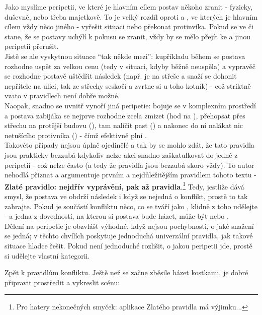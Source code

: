 \documentclass[../main.tex]{subfiles}
\begin{document}
Jako  myslíme peripetii, ve které je hlavním cílem postav někoho zranit - fyzicky, duševně, nebo třeba majetkově. To je velký rozdíl oproti  a , ve kterých je hlavním cílem vždy něco jiného - vyřešit situaci nebo překonat protinvíka. Pokud se ve  či  stane, že se postavy uchýlí k pokusu se zranit, vždy by se mělo přejít ke  a jinou peripetii přerušit.\\
Jistě se ale vyskytnou situace ``tak někde mezi'': kupříkladu během  se postava rozhodne uspět za velkou cenu (tedy v situaci, kdyby běžně neuspěla) a vypravěč se rozhodne postavě uštědřit následek (např. je na střeše a snaží se dohonit nepřítele na ulici, tak ze střechy seskočí a zvrtne si u toho kotník) - což striktně vzato v pravidlech  není dobře možné.\\
Naopak, snadno se uvnitř  vynoří jiná peripetie: bojuje se v komplexním prostředí a postava zabijáka se nejprve rozhodne zcela zmizet (hod na ), přehopsat přes střechu na protější budovu (), tam nalíčit past () a nakonec do ní nalákat nic netušícího protivníka () - čímž efektivně plní .\\
Takovéto případy nejsou úplně ojedinělé a tak by se mohlo zdát, že tato pravidla jsou prakticky bezzubá kdykoliv nelze akci snadno zaškatulkovat do jedné z peripetií - což nelze často (a tedy že pravidla jsou bezzubá skoro vždy). To autor nehodlá přiznat a argumentuje prvním a nejdůležitějším pravidlem tohoto textu - \textbf{Zlaté pravidlo: nejdřív vyprávění, pak až pravidla}.\footnote{Pro hatery nekonečných smyček: aplikace Zlatého pravidla má výjimku...} Tedy, jestliže dává smysl, že postava ve  obdrží následek i když se nejedná o konflikt, prostě to tak zahrajte. Pokud je součástí konfliktu něco, co se tváří jako , klidně z toho  udělejte - a jedna z dovedností, na kterou si postava bude házet, může být  nebo .\\

Dělení na peripetie je obzvlášť výhodné, když nejsou pochybnosti, o jaké snažení se jedná; v těchto chvílích poskytuje jednoduchá univerzální pravidla, jak takové situace hladce řešit. Pokud není jednoduché rozlišit, o jakou peripetii jde, prostě si udělejte vlastní kategorii.



Zpět k pravidlům konfliktu. Ještě než se začne zběsile házet kostkami, je dobré připravit prostředit a vykreslit scénu:
\end{document}
